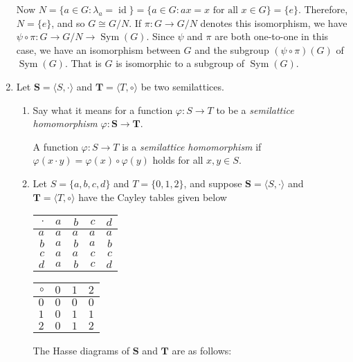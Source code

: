 \documentclass[fleqn,12pt]{article}
\newcommand{\<}{\ensuremath{\langle}}
\renewcommand{\>}{\ensuremath{\rangle}}
\newcommand{\Sym}{\ensuremath{\operatorname{Sym}}}
\newcommand{\id}{\ensuremath{\operatorname{id}}}
\newcommand{\bS}{\ensuremath{\mathbf{S}}}
\newcommand{\bT}{\ensuremath{\mathbf{T}}}
\begin{document}
\begin{enumerate}[{\bf 1.}]
Now
$N = \{a\in G: \lambda_a = \id\} = \{a\in G: ax = x \text{ for all } x \in G\} = \{e\}$.
Therefore, $N = \{e\}$, and so $G \cong G/N$.  If $\pi: G \rightarrow G/N$
denotes this isomorphism, we have 
$\psi\circ \pi : G \rightarrow G/N \rightarrow \Sym(G)$.  Since $\psi$ and $\pi$
are both one-to-one in this case, we have an isomorphism between $G$ and the
subgroup $(\psi\circ \pi)(G)$ of $\Sym(G)$.  That is $G$ is isomorphic to a
subgroup of $\Sym(G)$.
\newpage

\item Let $\bS = \<S, \cdot\>$ and $\bT = \<T, \circ\>$ be two semilattices.
  \begin{enumerate}
  \item Say what it means for a function $\varphi: S \rightarrow T$ to be a
    \emph{semilattice homomorphism} $\varphi: \bS \rightarrow \bT$.

\medskip

A function $\varphi: S \rightarrow T$ is
a \emph{semilattice homomorphism} if  
$\varphi(x\cdot y) = \varphi(x) \circ \varphi(y)$
holds for all $x, y \in S$.

\bigskip

\item Let $S = \{a, b, c, d\}$ and $T = \{0, 1, 2\}$, and suppose 
  $\bS = \<S, \cdot\>$ and
  $\bT= \<T, \circ\>$ have the Cayley tables given below

\medskip
\begin{center}
\begin{tabular}{r|rrrr}
  $\cdot$ & $a$ &$b$&$c$&$d $\\
\hline
  $a$ & $a$ &$a$&$a$&$a$\\
  $b$ & $a$ &$b$&$a$&$b$\\
  $c$ & $a$ &$a$&$c$&$c$\\
  $d$ & $a$ &$b$&$c$&$d$
\end{tabular}
\hskip2cm
\begin{tabular}{r|rrr}
  $\circ$ & $0$ &$1$&$2$\\
\hline
  $0$ & $0$ &$0$&$0$\\
  $1$ & $0$ &$1$&$1$\\
  $2$ & $0$ &$1$&$2$
\end{tabular}
\end{center}

\medskip
The Hasse diagrams of $\bS$ and $\bT$ are as follows:
\begin{center}
  
\end{center}
\end{enumerate}
\end{enumerate}
\end{document}
